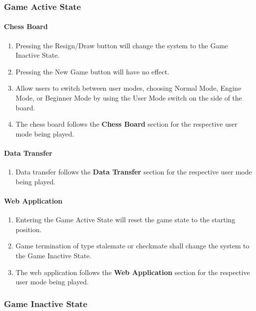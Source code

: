\documentclass[12pt]{article}
\begin{document}
{\subsubsection{Game Active State}
\paragraph{Chess Board}
\begin{enumerate}[{GA}1., leftmargin=2\parindent]
    \item Pressing the Resign/Draw button will change the system to the Game Inactive State.
    \item Pressing the New Game button will have no effect.
    \item Allow users to switch between user modes, choosing Normal Mode, Engine Mode, or Beginner Mode by using the User Mode switch on the side of the board.
    \item The chess board follows the \textbf{Chess Board} section for the respective user mode being played.
\end{enumerate}

\paragraph{Data Transfer}
\begin{enumerate}[{GA}1., leftmargin=2\parindent, resume]
    \item Data transfer follows the \textbf{Data Transfer} section for the respective user mode being played.
\end{enumerate}

\paragraph{Web Application}
\begin{enumerate}[{GA}1., leftmargin=2\parindent, resume]
    \item Entering the Game Active State will reset the game state to the starting position.
    \item Game termination of type stalemate or checkmate shall change the system to the Game Inactive State.
    \item The web application follows the \textbf{Web Application} section for the respective user mode being played.
\end{enumerate}

\subsubsection{Game Inactive State}
}
\end{document}
